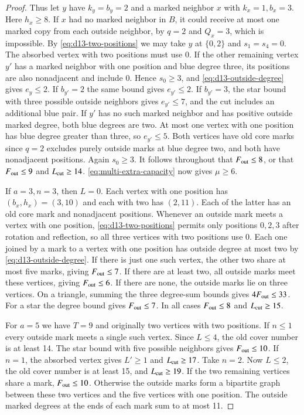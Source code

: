 \documentclass[preprint,11pt,numbers]{elsarticle-arxiv}
\numberwithin{equation}{section}
\theoremstyle{definition}
\begin{document}
\begin{proof}
Thus let $y$ have $k_y=b_y=2$ and a marked neighbor $x$ with
$k_x=1,b_x=3$. Here $h_x\ge8$. If $x$ had no marked neighbor in
$B$, it could receive at most one marked copy from each outside
neighbor, by $q=2$ and $Q_x=3$, which is impossible. By
\eqref{eq:d13-two-positions} we may take $y$ at $\{0,2\}$ and
$s_1=s_4=0$. The absorbed vertex with two positions must use 0.
If the other remaining vertex $y'$ has a marked neighbor with one
position and blue degree three, its positions are also nonadjacent
and include 0. Hence $s_0\ge3$, and \eqref{eq:d13-outside-degree}
gives $e_y\le2$. If $b_{y'}=2$ the same bound gives $e_{y'}\le2$.
If $b_{y'}=3$, the star bound with three possible outside neighbors
gives $e_{y'}\le7$, and the cut includes an additional blue pair.
If $y'$ has no such marked neighbor and has positive outside marked
degree, both blue degrees are two. At most one vertex with one position
has blue degree greater than three, so $e_{y'}\le5$. Both vertices
have old core marks since $q=2$ excludes purely outside marks at
blue degree two, and both have nonadjacent positions. Again $s_0\ge3$.
It follows throughout that $F_{\rm out}\le8$, or that
$F_{\rm out}\le9$ and $L_{\rm cut}\ge14$.
\eqref{eq:multi-extra-capacity} now gives $\mu\ge6$.

If $a=3,n=3$, then $L=0$. Each vertex with one position has
$(b_x,h_x)=(3,10)$ and each with two has $(2,11)$. Each of the
latter has an old core mark and nonadjacent positions.
Whenever an outside mark meets a vertex with one position,
\eqref{eq:d13-two-positions} permits only positions $0,2,3$ after
rotation and reflection, so all three vertices with two positions
use 0. Each one joined by a mark to a vertex with one position
has outside degree at most two by \eqref{eq:d13-outside-degree}.
If there is just one such vertex, the other two share at most five
marks, giving $F_{\rm out}\le7$. If there are at least two, all
outside marks meet these vertices, giving $F_{\rm out}\le6$. If
there are none, the outside marks lie on three vertices. On a triangle,
summing the three degree-sum bounds gives $4F_{\rm out}\le33$.
For a star the degree bound gives $F_{\rm out}\le7$. In all cases
$F_{\rm out}\le8$ and $L_{\rm cut}\ge15$.

For $a=5$ we have $T=9$ and originally two vertices with two
positions. If $n\le1$ every outside mark meets a single such vertex.
Since $L\le4$, the old cover number is at least 14. The star bound
with five possible neighbors gives $F_{\rm out}\le10$. If $n=1$,
the absorbed vertex gives $L'\ge1$ and $L_{\rm cut}\ge17$.
Take $n=2$. Now $L\le2$, the old cover number is at least 15,
and $L_{\rm cut}\ge19$. If the two remaining vertices share a mark,
$F_{\rm out}\le10$. Otherwise the outside marks form a bipartite
graph between these two vertices and the five vertices with one
position. The outside marked degrees at the ends of each mark sum
to at most 11.


\end{proof}
\end{document}
